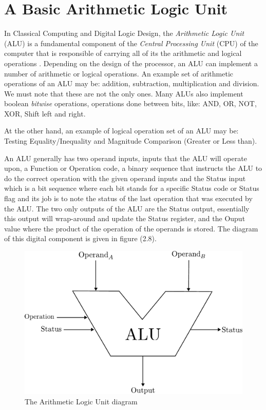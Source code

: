 \section{A Basic Arithmetic Logic Unit}

In Classical Computing and Digital Logic Design, the \textit{Arithmetic Logic Unit} (ALU) is a fundamental component of the \textit{Central Processing Unit} (CPU) of the computer 
that is responsible of carrying all of its the arithmetic and logical operations \cite{Giannakopoulos2015}. Depending on the design of the processor, an ALU can implement
a number of arithmetic or logical operations. An example set of arithmetic operations of an ALU may be: addition, subtraction, multiplication and division. We must note that
these are not the only ones. Many ALUs also implement boolean \textit{bitwise} operations, operations done between bits, like: AND, OR, NOT, XOR, Shift left and right.

At the other hand, an example of logical operation set of an ALU may be: Testing Equality/Inequality and Magnitude Comparison (Greater or Less than).

An ALU generally has two operand inputs, inputs that the ALU will operate upon, a Function or Operation code, a binary sequence that instructs the ALU to do the correct operation
with the given operand inputs and the Status input which is a bit sequence where each bit stands for a specific Status code or Status flag and its job is to note the status of the
last operation that was executed by the ALU. The two only outputs of the ALU are the Status output, essentially this output will wrap-around and update the Status register, and
the Ouput value where the product of the operation of the operands is stored. The diagram of this digital component is given in figure (2.8).

\begin{figure}[!ht]
    \centering
    \includegraphics[scale=.4]{images/2_Classical_Computing/alu.pdf}
    \caption{The Arithmetic Logic Unit diagram}
\end{figure}


